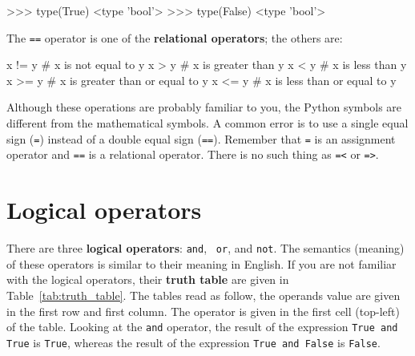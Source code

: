 \beforeverb
\begin{pyinterpreter}
>>> type(True)
<type 'bool'>
>>> type(False)
<type 'bool'>
\end{pyinterpreter}
\afterverb
%
The {\tt ==} operator is one of the {\bf relational operators}; the
others are:

\beforeverb
\begin{pycode}
x != y               # x is not equal to y
x > y                # x is greater than y
x < y                # x is less than y
x >= y               # x is greater than or equal to y
x <= y               # x is less than or equal to y
\end{pycode}
\afterverb
%
Although these operations are probably familiar to you, the Python
symbols are different from the mathematical symbols.  A common error
is to use a single equal sign ({\tt =}) instead of a double equal sign
({\tt ==}).  Remember that {\tt =} is an assignment operator and
{\tt ==} is a relational operator.   There is no such thing as
{\tt =<} or {\tt =>}.



\section {Logical operators}

There are three {\bf logical operators}: {\tt and}, {\tt
or}, and {\tt not}.  The semantics (meaning) of these operators is
similar to their meaning in English. If you are not familiar with the logical operators, their {\bf truth table} are given in Table~\ref{tab:truth_table}. The tables read as follow, the operands value are given in the first row and first column. The operator is given in the first cell (top-left) of the table. Looking at the {\tt and} operator, the result of the expression {\tt True and True} is {\tt True}, whereas the result of the expression {\tt True and False} is {\tt False}.

